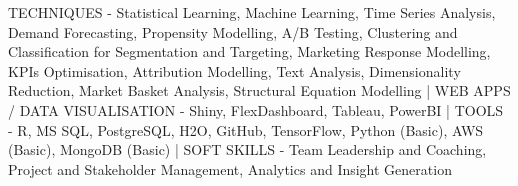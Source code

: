

\begin{cvparagraph}

TECHNIQUES - Statistical Learning, Machine Learning, Time Series Analysis, Demand Forecasting, Propensity Modelling, A/B Testing, Clustering and Classification for Segmentation and Targeting, Marketing Response Modelling, KPIs Optimisation, Attribution Modelling, Text Analysis, Dimensionality Reduction, Market Basket Analysis, Structural Equation Modelling | WEB APPS / DATA VISUALISATION -  Shiny, FlexDashboard, Tableau, PowerBI | TOOLS - R, MS SQL, PostgreSQL, H2O, GitHub, TensorFlow, Python (Basic), AWS (Basic), MongoDB (Basic) | SOFT SKILLS - Team Leadership and Coaching, Project and Stakeholder Management, Analytics and Insight Generation
\end{cvparagraph}
